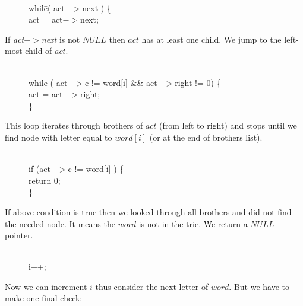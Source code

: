 \documentclass[a4paper,12pt]{article}
\begin{document}
\begin{figure}[!h]
\begin{tabbing}
\quad \quad \= \\
\> whil\=e( act$->$next ) \{ \\
\> \>    act = act$->$next; \\
\end{tabbing}
\end{figure}

\noindent If \emph{act$->$next} is not $NULL$ then $act$ has at least one child. We jump to the left-most child of $act$.

\begin{figure}[!h]
\begin{tabbing}
\quad \quad \quad \quad \= \\
\>    whil\=e ( act$->$c != word[i] \&\& act$->$right != 0) \{ \\
\> \>     act = act$->$right; \\
\>    \} \\
\end{tabbing}
\end{figure}

\noindent This loop iterates through brothers of $act$ (from left to right) and stops until we find node with letter equal to $word[i]$ (or at the end of brothers list).

\begin{figure}[!h]
\begin{tabbing}
\quad \quad \quad \quad \= \\
\>    if (\= act$->$c != word[i] ) \{ \\
\> \>      return 0; \\
\>    \} \\
\end{tabbing}
\end{figure}

\noindent If above condition is true then we looked through all brothers and did not find the needed node. It means the $word$ is not in the trie. We return a $NULL$ pointer.

\begin{figure}[!h]
\begin{tabbing}
\quad \quad \quad \quad \= \\
\>   i++; \\
\end{tabbing}
\end{figure}

\noindent Now we can increment $i$ thus consider the next letter of $word$. But we have to make one final check:
\end{document}
